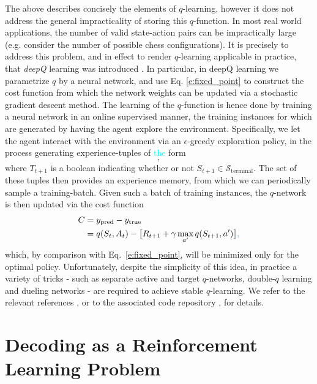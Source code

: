 \documentclass[twocolumn,preprintnumbers,amsmath,amssymb,notitlepage,nofootinbib,longbibliography,superscriptaddress,aps,pra,10pt]{revtex4-1}
\newcommand{\je}[1]{\textcolor{cyan}{#1}}
\begin{document}
	The above describes concisely the elements of $q$-learning, however it does not address the general impracticality of storing this $q$-function.
	In most real world applications, the number of valid state-action pairs can be impractically large (e.g. consider the number of possible chess configurations).
	It is precisely to address this problem, and in effect to render $q$-learning applicable in practice, that \textit{deepQ} learning was introduced \cite{RLMnih15,RLvan2016deep,RLschaul2015prioritized}.
	In particular, in deepQ learning we parametrize $q$ by a neural network, and use Eq. \eqref{e:fixed_point} to construct the cost function from which the network weights can be updated via a stochastic gradient descent method.
	The learning of the $q$-function is hence done by training a neural network in an online supervised manner, the training instances for which are generated by having the agent explore the environment.
	Specifically, we let the agent interact with the environment via an $\epsilon$-greedy exploration policy, in the process generating experience-tuples of \je{the}
	form
	\begin{equation}
		[S_t,A_t,R_{t+1},S_{t+1},T_{t+1}],
	\end{equation}
	where $T_{t+1}$ is a boolean indicating whether or not $S_{t+1} \in \mathcal{S}_\mathrm{terminal}$.
	The set of these tuples then provides an experience memory, from which we can periodically sample a training-batch.
	Given such a batch of training instances, the $q$-network is then updated via the cost function
	\begin{align}
		C &= y_{\mathrm{pred}} - y_{\mathrm{true}}\\
		&= q(S_t,A_t) - \big[R_{t+1} + \gamma\max_{a'}q(S_{t+1},a') \big]\je{,}
	\end{align}
	which, by comparison with Eq.~\eqref{e:fixed_point}, will be minimized only for the optimal policy.
	Unfortunately, despite the simplicity of this idea, in practice a variety of tricks - such as separate active and target $q$-networks, double-$q$ learning and dueling networks - are required to achieve stable $q$-learning.
	We refer to the relevant references \cite{RLMnih15,RLvan2016deep,RLschaul2015prioritized,RLwang2015dueling}, or to the associated code repository \cite{DeepQDecoding}, for details.

\section{Decoding as a Reinforcement Learning Problem}\label{s:decoding_as_rl}
\end{document}
